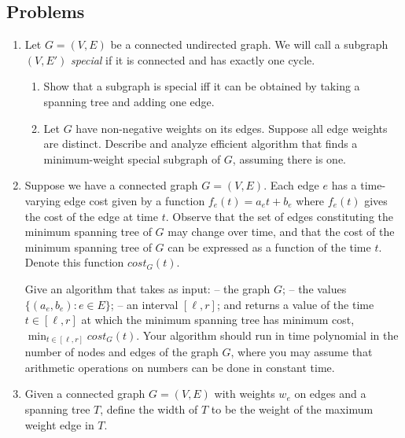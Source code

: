\documentclass{article}
\begin{document}

\noindent
{}

\subsection*{Problems}

\begin{enumerate}
%
	\item 
		Let $G = (V,E)$ be a connected undirected graph.  We will call a subgraph
$(V,E')$ \emph {special} if it is connected and has exactly one cycle.

	\begin{enumerate}
		\item Show that a subgraph is special iff it can be obtained by taking a
spanning tree and adding one edge.
		\item Let $G$ have non-negative weights on its edges.  Suppose all edge
weights are distinct. Describe and analyze efficient algorithm that finds a
minimum-weight special subgraph of $G$, assuming there is one.  
	\end{enumerate}
%

	\item Suppose we have a connected graph $G = (V, E)$. Each edge $e$ has a
time-varying edge cost given by a function $f_e(t) = a_et + b_e$ where $f_e(t)$
gives the cost of the edge at time $t$.  Observe that the set of edges
constituting the minimum spanning tree of $G$ may change over time, and that
the cost of the minimum spanning tree of $G$ can be expressed as a function of
the time $t$. Denote this function $cost_G(t)$.

Give an algorithm that takes as input: -- the graph $G$; -- the values $\{(a_e,
b_e) : e \in E\}$; -- an interval $[\ell , r]$; and returns a value of the time
$t\in [\ell,r]$ at which the minimum spanning tree has minimum cost, $\min_{t
\in [\ell,r]} cost_G(t)$. Your algorithm should run in time polynomial in the
number of nodes and edges of the graph $G$, where you may assume that
arithmetic operations on numbers can be done in constant time.

%
		\item Given a connected graph $G=(V,E)$ with weights $w_e$ on edges and
a spanning tree $T$, define the width of $T$ to be the weight of the maximum
weight edge in $T$.


\end{enumerate}
\end{document}
